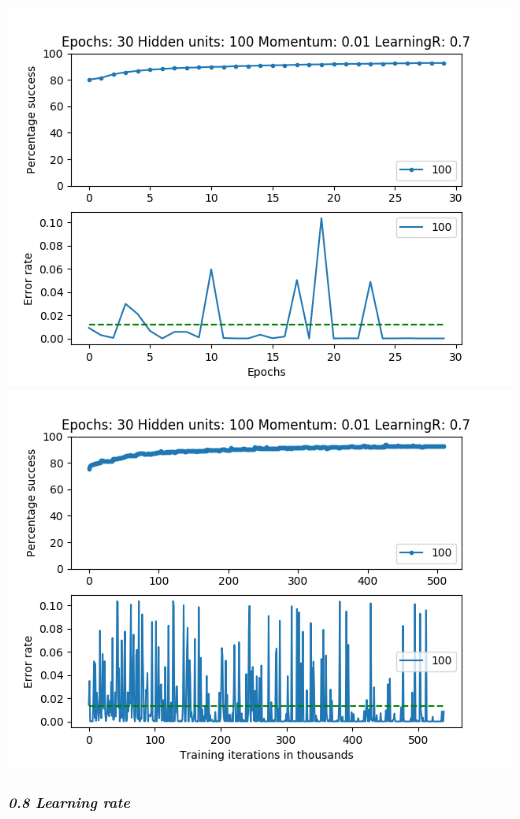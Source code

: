 \documentclass[11pt]{article}
\makeatletter
\def\maxwidth{\ifdim\Gin@nat@width>\linewidth\linewidth
    \else\Gin@nat@width\fi}
\let\Oldincludegraphics\includegraphics
\renewcommand{\includegraphics}[1]{\Oldincludegraphics[width=.8\maxwidth]{#1}}
\makeatother
\begin{document}
\includegraphics{Experiment2/E2_NN_Epoch_Momentum_0.01_30Epochs_100_LR_0.7_Hiddenunits.png}
\includegraphics{Experiment2/E2_NN_Training_Momentum_0.01_30Epochs_100_LR_0.7_Hiddenunits.png}

\hypertarget{learning-rate-8}{%
\subparagraph{0.8 Learning rate}\label{learning-rate-8}}
\end{document}
